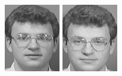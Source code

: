 \begin{figure}[ht]
 \includegraphics[width=\columnwidth/11]{ch3/figures/s6_3.png}
 \includegraphics[width=\columnwidth/11]{ch3/figures/s6_4.png}

\end{figure}
